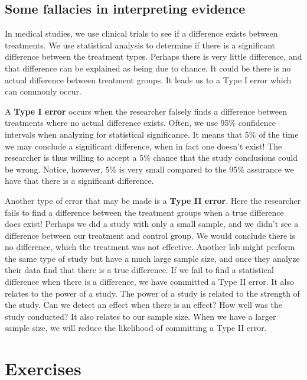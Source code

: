 \documentclass[11pt, chapterprefix=true]{scrbook}\usepackage[]{graphicx}\usepackage[]{color}
\begin{document}
\subsection{Some fallacies in interpreting evidence} 

In medical studies, we use clinical trials to see if a difference exists between treatments.  We use statistical analysis to determine if there is a significant difference between the treatment types.  Perhaps there is very little difference, and that difference can be explained as being due to chance.  It could be there is no actual difference between treatment groups.  It leads us to a Type I error which can commonly occur.

A \textbf{Type I error} occurs when the researcher falsely finds a difference between treatments where no actual difference exists.  Often, we use 95\% confidence intervals when analyzing for statistical significance.  It means that 5\% of the time we may conclude a significant difference, when in fact one doesn’t exist!  The researcher is thus willing to accept a 5\% chance that the study conclusions could be wrong.  Notice, however, 5\% is very small compared to the 95\% assurance we have that there is a significant difference.

Another type of error that may be made is a \textbf{Type II error}.  Here the researcher fails to find a difference between the treatment groups when a true difference does exist!  Perhaps we did a study with only a small sample, and we didn't see a difference between our treatment and control group.  We would conclude there is no difference, which the treatment was not effective.  Another lab might perform the same type of study but have a much large sample size, and once they analyze their data find that there is a true difference.  If we fail to find a statistical difference when there is a difference, we have committed a Type II error.  It also relates to the power of a study.  The power of a study is related to the strength of the study.  Can we detect an effect when there is an effect?  How well was the study conducted?  It also relates to our sample size.  When we have a larger sample size, we will reduce the likelihood of committing a Type II error.


\twocolumn

\section{Exercises}    %
\end{document}
